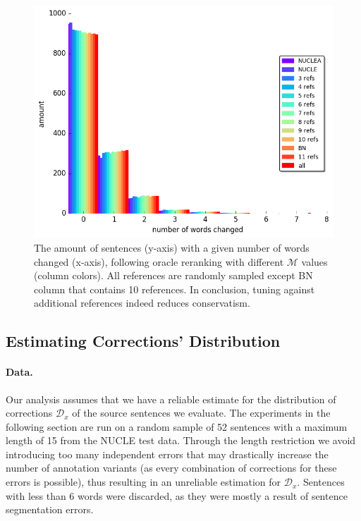 \documentclass[letterpaper, 11pt]{article}
\newcommand{\lc}[1]{}
\begin{document}
\begin{figure}
	\vspace{-1em}
	\includegraphics[width=0.9\columnwidth]{words_differences_hist_reranking}
	\caption{\lc{move figure to appendix?}The amount of sentences (y-axis) with a given number of words changed (x-axis), following oracle reranking with different $\mathcal{M}$ values (column colors). All references are randomly sampled except BN column that contains  10 references.
		In conclusion, tuning against additional references indeed reduces conservatism.
		\label{fig:reranking_word_change}
        }
	\vspace{-0.5cm}
\end{figure}
%
\subsection{Estimating Corrections' Distribution}\label{subsec:corrections_distribution}
%
\paragraph{Data.}
Our analysis assumes that we have a reliable estimate for the distribution of corrections
$\mathcal{D}_x$ of the source sentences we evaluate.
The experiments in the following section are run on a random sample of 52 sentences with a maximum length of 15 from the NUCLE test data.
Through the length restriction we avoid introducing too many independent errors that may drastically increase the number of annotation 
variants (as every combination of corrections for these errors is possible), thus resulting in an unreliable estimation for $\mathcal{D}_x$.
Sentences with less than 6 words were discarded, as they were mostly a result of sentence segmentation errors.
\end{document}
